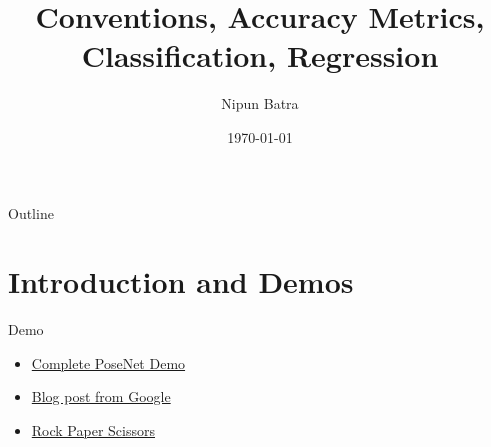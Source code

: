 \documentclass[usenames,dvipsnames]{beamer}
\title{Conventions, Accuracy Metrics, Classification, Regression}
\date{\today}
\author{Nipun Batra}
\institute{IIT Gandhinagar}
\begin{document}
%

  \makeatletter
  \makeatother
  \setcounter{popquiz}{0}

  \maketitle
  
  \begin{frame}{Outline}
    \tableofcontents
  \end{frame}
  
  \section{Introduction and Demos}
  
  \begin{frame}{Demo}
	\begin{itemize}
		\item \href{https://storage.googleapis.com/tfjs-models/demos/posenet/camera.html}{Complete PoseNet Demo}
		\item \href{https://blog.tensorflow.org/2018/05/real-time-human-pose-estimation-in.html}{Blog post from Google}
		\item \href{https://rps-tfjs.netlify.app}{Rock Paper Scissors}
	\end{itemize}
  \end{frame}
  
\end{document}
